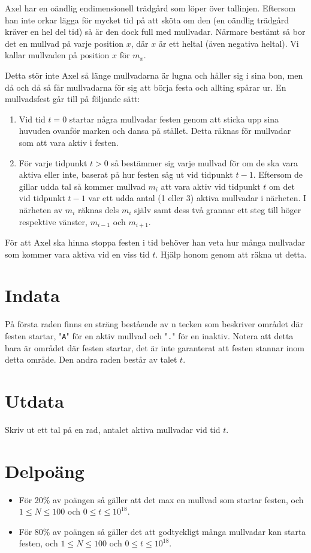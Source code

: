
Axel har en oändlig endimensionell trädgård som löper över tallinjen. Eftersom han inte orkar lägga för mycket tid på att sköta om den (en oändlig trädgård kräver en hel del tid) så är den dock full med mullvadar. Närmare bestämt så bor det en mullvad på varje position $x$, där $x$ är ett heltal (även negativa heltal). Vi kallar mullvaden på position $x$ för $m_x$.

Detta stör inte Axel så länge mullvadarna är lugna och håller sig i sina bon, men då och då så får mullvadarna för sig att börja festa och allting spårar ur. En mullvadsfest går till på följande sätt:
\begin{enumerate}
\item Vid tid $t=0$ startar några mullvadar festen genom att sticka upp sina huvuden ovanför marken och dansa på stället. Detta räknas för mullvadar som att vara aktiv i festen.
\item För varje tidpunkt $t > 0$ så bestämmer sig varje mullvad för om de ska vara aktiva eller inte, baserat på hur festen såg ut vid tidpunkt $t-1$. Eftersom de gillar udda tal så kommer mullvad $m_i$ att vara aktiv vid tidpunkt $t$ om det vid tidpunkt $t-1$ var ett udda antal (1 eller 3) aktiva mullvadar i närheten. I närheten av $m_i$ räknas dels $m_i$ själv samt dess två grannar ett steg till höger respektive vänster, $m_{i-1}$ och $m_{i+1}$.
\end{enumerate}

För att Axel ska hinna stoppa festen i tid behöver han veta hur många mullvadar som kommer vara aktiva vid en viss tid $t$. Hjälp honom genom att räkna ut detta.

\section*{Indata}
På första raden finns en sträng bestående av n tecken som beskriver området där festen startar, "\texttt{A}" för en aktiv mullvad och "\texttt{.}" för en inaktiv. Notera att detta bara är området där festen startar, det är inte garanterat att festen stannar inom detta område. Den andra raden består av talet $t$.

\section*{Utdata}
Skriv ut ett tal på en rad, antalet aktiva mullvadar vid tid $t$.

\section*{Delpoäng}
\begin{itemize}
\item För 20\% av poängen så gäller att det max en mullvad som startar festen, och $1 \leq N \leq 100$ och $0 \leq t \leq 10^{18}$.
\item För 80\% av poängen så gäller det att godtyckligt många mullvadar kan starta festen, och $1 \leq N \leq 100$ och $0 \leq t \leq 10^{18}$.
\end{itemize}

